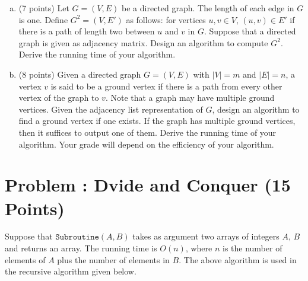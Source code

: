 \documentclass[12pt]{amsart}
\newcounter{pNum}
\newcommand{\problem}[2]{\addtocounter{pNum}{1}
\section*{Problem \arabic{pNum}: #1 (#2 Points)}}
\begin{document}
\begin{enumerate}[(a)]
\item (7 points)
Let $G= (V,E)$ be a directed graph.
The length of each edge in $G$ is one.
Define $G^{2} = (V,E')$ as follows: for vertices $u,v \in V$,
$(u,v) \in E'$ if there is a path of length two between $u$ and $v$ in $G$.
Suppose that a directed graph is given as adjacency matrix.
Design an algorithm to compute $G^2$.
Derive the running time of your algorithm. 


\newpage

\item(8 points)
Given a directed graph $G = (V, E)$ with $|V| = m$ and $|E| = n$, a vertex $v$ is said to be a ground vertex if there is a path from every other vertex of the graph to $v$.
Note that a graph may have multiple ground vertices.  
Given the adjacency list representation of $G$, design an algorithm to find a ground vertex if one exists. 
If the graph has multiple ground vertices, then it suffices to output one of them.
Derive the running time of your algorithm.
Your grade will depend on the efficiency of your algorithm. 


\end{enumerate}

\newpage

\problem{Dvide and Conquer}{15}

Suppose that $\mathtt{Subroutine}(A,B)$ takes as argument two arrays of integers $A$, $B$ and returns an array. 
The running time is $O(n)$, where $n$ is the number of elements of $A$ plus the number of elements in $B$.
The above algorithm is used in the recursive \Mystery algorithm given below.

\end{document}
